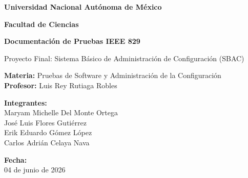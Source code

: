 \documentclass[12pt, letterpaper]{article}
\begin{document}
\begin{center}
    \vspace*{1cm}
    
    {\Large \textbf{Universidad Nacional Autónoma de México} \par}
    \vspace{0.5cm}
    {\large \textbf{Facultad de Ciencias} \par}
    
    \vspace{2cm}
    
    {\LARGE \textbf{Documentación de Pruebas IEEE 829} \par}
    \vspace{0.5cm}
    {\Large Proyecto Final: Sistema Básico de Administración de Configuración (SBAC) \par}
    
    \vspace{2cm}
    
    \textbf{Materia:} Pruebas de Software y Administración de la Configuración \\
    \textbf{Profesor:} Luis Rey Rutiaga Robles \\
    
    \vspace{1.5cm}
    
    \textbf{Integrantes:}\\
    Maryam Michelle Del Monte Ortega \\
    José Luis Flores Gutiérrez \\
    Erik Eduardo Gómez López\\
    Carlos Adrián Celaya Nava \\

    \vspace{2cm}
    
    \textbf{Fecha:}\\
    04 de junio de 2026
    
    \vfill
\end{center}

\newpage
\end{document}
